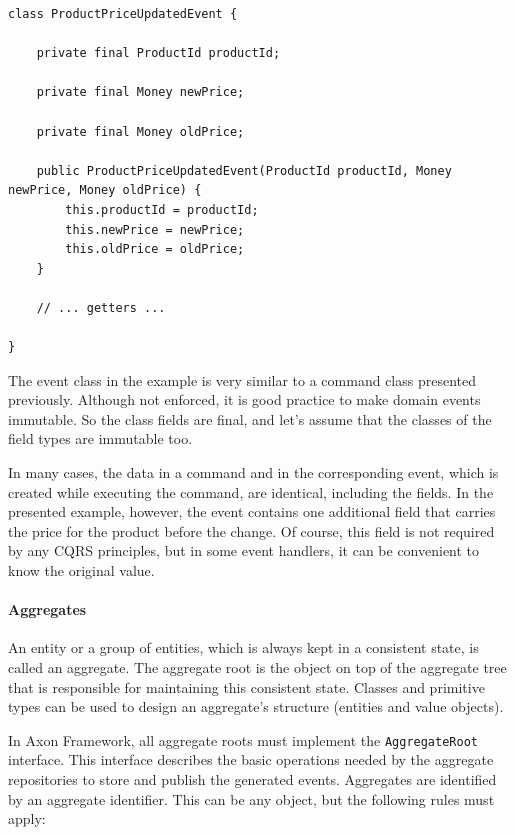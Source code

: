 \documentclass{book}
\begin{document}
\begin{lstlisting}[caption={An example of an event class in Axon},label={lst:updatedEvent},captionpos=b,float,floatplacement=H]
class ProductPriceUpdatedEvent {
    
    private final ProductId productId;

    private final Money newPrice;

    private final Money oldPrice;

    public ProductPriceUpdatedEvent(ProductId productId, Money newPrice, Money oldPrice) {
        this.productId = productId;
        this.newPrice = newPrice;
        this.oldPrice = oldPrice;
    }

    // ... getters ...

}
\end{lstlisting}

The event class in the example is very similar to a command class
presented previously. Although not enforced, it is good practice to make
domain events immutable. So the class fields are final, and let's assume
that the classes of the field types are immutable too.

In many cases, the data in a command and in the corresponding event,
which is created while executing the command, are identical, including
the fields. In the presented example, however, the event contains one
additional field that carries the price for the product before the
change. Of course, this field is not required by any CQRS principles,
but in some event handlers, it can be convenient to know the original
value.

\paragraph{Aggregates}\label{aggregates}

An entity or a group of entities, which is always kept in a consistent
state, is called an aggregate. The aggregate root is the object on top
of the aggregate tree that is responsible for maintaining this
consistent state. Classes and primitive types can be used to design an
aggregate's structure (entities and value objects).

In Axon Framework, all aggregate roots must implement the
\texttt{AggregateRoot} interface. This interface describes the basic
operations needed by the aggregate repositories to store and publish the
generated events. Aggregates are identified by an aggregate identifier.
This can be any object, but the following rules must apply:
\end{document}
